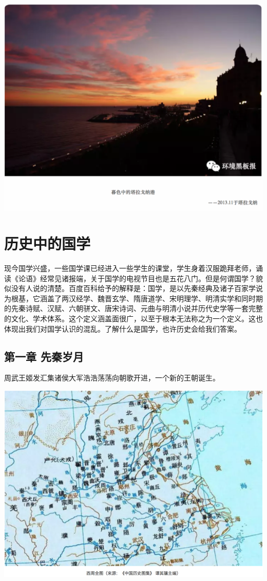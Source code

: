\documentclass[]{book}
\begin{document}
\includegraphics[width=8.33in]{images/xt24}

\section{历史中的国学}

现今国学兴盛，一些国学课已经进入一些学生的课堂，学生身着汉服跪拜老师，诵读《论语》经常见诸报端，关于国学的电视节目也是五花八门。但是何谓国学？貌似没有人说的清楚。百度百科给予的解释是：国学，是以先秦经典及诸子百家学说为根基，它涵盖了两汉经学、魏晋玄学、隋唐道学、宋明理学、明清实学和同时期的先秦诗赋、汉赋、六朝骈文、唐宋诗词、元曲与明清小说并历代史学等一套完整的文化、学术体系。这个定义涵盖面很广，以至于根本无法称之为一个定义。这也体现出我们对国学认识的混乱。了解什么是国学，也许历史会给我们答案。

\subsection{第一章 先秦岁月}\label{-}

周武王姬发汇集诸侯大军浩浩荡荡向朝歌开进，一个新的王朝诞生。

\includegraphics[width=8.33in]{images/gx1}
\end{document}
